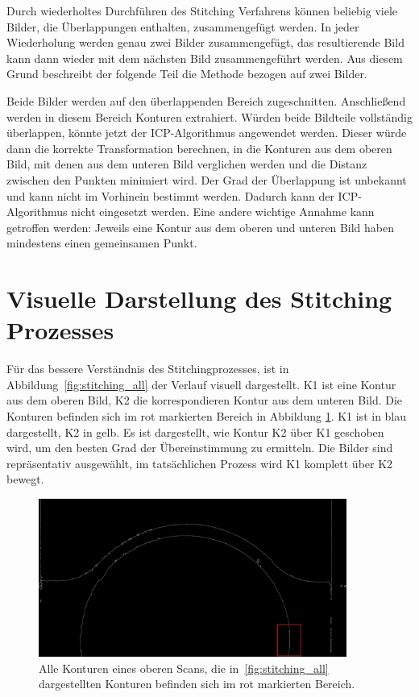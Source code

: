 Durch wiederholtes Durchführen des Stitching Verfahrens können beliebig viele Bilder, 
die Überlappungen enthalten, zusammengefügt werden. In jeder Wiederholung werden genau
zwei Bilder zusammengefügt, das resultierende Bild kann dann wieder mit dem
nächsten Bild zusammengeführt werden. Aus diesem Grund beschreibt der folgende 
Teil die Methode bezogen auf zwei Bilder.

Beide Bilder werden auf den überlappenden Bereich zugeschnitten. 
Anschließend werden in diesem Bereich Konturen extrahiert. 
Würden beide Bildteile vollständig überlappen, könnte jetzt der ICP-Algorithmus
angewendet werden. Dieser würde dann die korrekte Transformation berechnen, in 
die Konturen aus dem oberen Bild, mit denen aus dem unteren Bild verglichen werden
und die Distanz zwischen den Punkten minimiert wird. 
Der Grad der Überlappung ist unbekannt und kann nicht im Vorhinein bestimmt werden.
Dadurch kann der ICP-Algorithmus nicht eingesetzt werden. 
Eine andere wichtige Annahme kann getroffen werden: Jeweils eine Kontur aus 
dem oberen und unteren Bild haben mindestens einen gemeinsamen Punkt.

\section{Visuelle Darstellung des Stitching Prozesses}

Für das bessere Verständnis des Stitchingprozesses, ist in Abbildung~\ref{fig:stitching_all} 
der Verlauf visuell dargestellt.
K1 ist eine Kontur aus dem oberen Bild, K2 die korrespondieren Kontur aus dem 
unteren Bild. Die Konturen befinden sich im rot markierten Bereich in Abbildung 
\ref{fig:con_area}.
K1 ist in blau dargestellt, K2 in gelb. Es ist dargestellt, wie
Kontur K2 über K1 geschoben wird, um den besten Grad der Übereinstimmung zu ermitteln.
Die Bilder sind repräsentativ ausgewählt, im tatsächlichen Prozess wird K1 komplett 
über K2 bewegt.

\begin{figure}[h]
    \centering
    \includegraphics[width=0.9\textwidth]{images/all_cons_top_red.png} %
    \caption{Alle Konturen eines oberen Scans, die in~\ref{fig:stitching_all} dargestellten
    Konturen befinden sich im rot markierten Bereich.}
    \label{fig:con_area}
\end{figure}


